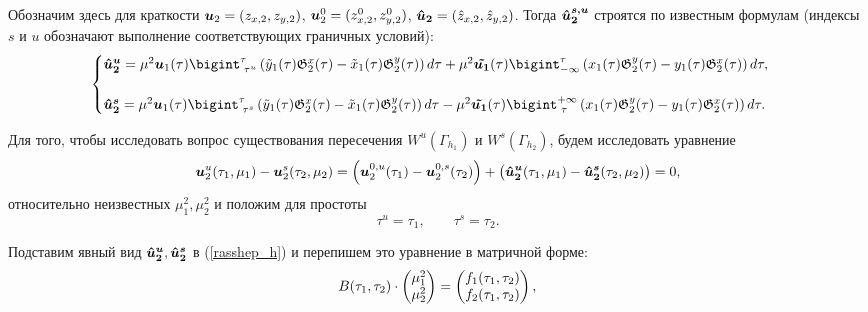 Обозначим здесь для краткости $\boldsymbol{u}_2 = (z_{x,2},z_{y,2})$, $\boldsymbol{u}_2^0 = (z_{x,2}^0,z_{y,2}^0)$, $\boldsymbol{\hat u_2} = (\hat z_{x,2}, \hat z_{y,2})$.
Тогда $\boldsymbol{\hat u_2^{s,u}}$ строятся по известным формулам (индексы $s$ и $u$ обозначают выполнение соответствующих граничных условий):
\begin{equation*}
    \begin{cases}
        \v {\hat u_2^u} = 
        \mu^2 \v u_1(\tau)\bigint_{\text{ } \tau^u}^\tau \left( \tilde y_1(\tau) \mathfrak{G}_2^x(\tau) - \tilde x_1(\tau) \mathfrak{G}_2^y(\tau) \right) d \tau + 
        \mu^2 \v{ \tilde{u_1}}(\tau) \bigint_{-\infty}^\tau \left( x_1(\tau) \mathfrak{G}_2^y(\tau) - y_1(\tau) \mathfrak{G}_2^x(\tau) \right) d \tau,\\
        \\
        
        \v {\hat u_2^s} = 
        \mu^2 \v u_1(\tau)\bigint_{\text{ } \tau^s}^{\tau} \left( \tilde y_1(\tau) \mathfrak{G}_2^x(\tau) - \tilde x_1(\tau) \mathfrak{G}_2^y(\tau) \right) d \tau - 
        \mu^2 \v{ \tilde{u_1}}(\tau) \bigint_{\text{ } \tau}^{+\infty} \left( x_1(\tau) \mathfrak{G}_2^y(\tau) - y_1(\tau) \mathfrak{G}_2^x(\tau) \right) d \tau. \\
    \end{cases}
    \label{neodnor_h}
\end{equation*}

Для того, чтобы исследовать вопрос существования пересечения $W^u(\Gamma_{h_1})$ и $W^s(\Gamma_{h_2})$, будем исследовать уравнение
\begin{equation}
\boldsymbol{u}_2^u (\tau_1,\mu_1) - \boldsymbol{u}_2^s (\tau_2,\mu_2) = \left(\boldsymbol{u}_2^{0,u} (\tau_1) - \boldsymbol{u}_2^{0,s} (\tau_2)\right) + \left(\boldsymbol{\hat u_2^u} (\tau_1, \mu_1) - \boldsymbol{\hat u_2^s} (\tau_2, \mu_2)\right) = 0,
\label{rasshep_h}
\end{equation}
относительно неизвестных $\mu_1^2, \mu_2^2$ и положим для простоты
$$\tau^u = \tau_1, \qquad \tau^s = \tau_2.$$

Подставим явный вид $\boldsymbol{\hat u_2^u},\boldsymbol{\hat u_2^s}$ в (\ref{rasshep_h}) и перепишем это уравнение в матричной форме:
\begin{equation}
\mathsmaller{
B(\tau_1, \tau_2) \cdot
\begin{pmatrix} 
\mu_1^2 \\ \mu_2^2
\end{pmatrix} = 
\begin{pmatrix} 
f_1(\tau_1,\tau_2) \\ f_2(\tau_1,\tau_2)
\end{pmatrix},
}
\label{hetero_sol}
\end{equation}

